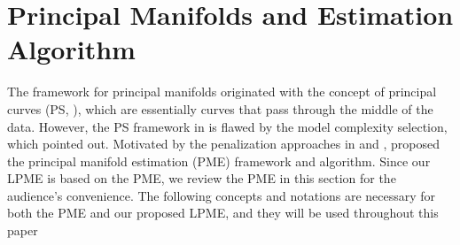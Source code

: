 \documentclass[11pt,reqno]{article}
\theoremstyle{definition}
\begin{document}
\section{Principal Manifolds and Estimation Algorithm}

The framework for principal manifolds originated with the concept of principal curves (PS, \cite{hastiePrincipalCurves1989}), which are essentially curves that pass through the middle of the data. However, the PS framework in \cite{hastiePrincipalCurves1989} is flawed by the model complexity selection, which \cite{duchamp1996extremal} pointed out. Motivated by the penalization approaches in \cite{kegl2000learning} and \cite{smolaRegularizedPrincipalManifolds2001}, \cite{mengPrincipalManifoldEstimation2021} proposed the principal manifold estimation (PME) framework and algorithm. Since our LPME is based on the PME, we review the PME in this section for the audience's convenience. The following concepts and notations are necessary for both the PME and our proposed LPME, and they will be used throughout this paper
\end{document}
